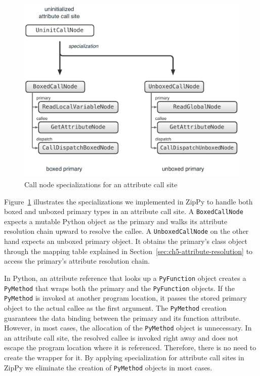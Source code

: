 \begin{figure}
\centering
\includegraphics[scale=.5]{figures/ch5-call-node-specialization-attribute}
\caption{Call node specializations for an attribute call site}
\label{fig:ch5-call-node-specialization-attribute}
\end{figure}

Figure~\ref{fig:ch5-call-node-specialization-attribute} illustrates the specializations we implemented in ZipPy to handle both boxed and unboxed primary types in an attribute call site.
A \texttt{BoxedCallNode} expects a mutable Python object as the primary and walks its attribute resolution chain upward to resolve the callee.
A \texttt{UnboxedCallNode} on the other hand expects an unboxed primary object.
It obtains the primary's class object through the mapping table explained in Section~\ref{sec:ch5-attribute-resolution} to access the primary's attribute resolution chain.

In Python, an attribute reference that looks up a \texttt{PyFunction} object creates a \texttt{PyMethod} that wraps both the primary and the \texttt{PyFunction} objects.
If the \texttt{PyMethod} is invoked at another program location, it passes the stored primary object to the actual callee as the first argument.
The \texttt{PyMethod} creation guarantees the data binding between the primary and its function attribute.
However, in most cases, the allocation of the \texttt{PyMethod} object is unnecessary.
In an attribute call site, the resolved callee is invoked right away and does not escape the program location where it is referenced.
Therefore, there is no need to create the wrapper for it.
By applying specialization for attribute call sites in ZipPy we eliminate the creation of \texttt{PyMethod} objects in most cases.

